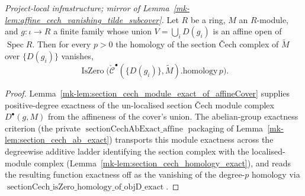 \begin{lemma}\label{mk-lem:sectionCech_homology_exact_of_affineCover}
  \leanok

  \textit{Project-local infrastructure; mirror of
  Lemma~\ref{mk-lem:affine_cech_vanishing_tilde_subcover}.}
  Let \(R\) be a ring, \(M\) an \(R\)-module, and \(g : \iota \to R\) a finite family whose union
  \(V = \bigcup_i D(g_i)\) is an affine open of \(\operatorname{Spec} R\). Then for every \(p > 0\) the
  homology of the section {\v C}ech complex of \(\widetilde{M}\) over \(\{D(g_i)\}\) vanishes,
  \[
    \operatorname{IsZero}\bigl(\check{\mathcal{C}}^\bullet(\{D(g_i)\}, \widetilde{M}).\mathrm{homology}\, p\bigr).
  \]
\end{lemma}
\begin{proof}
  \leanok
  Lemma~\ref{mk-lem:section_cech_module_exact_of_affineCover} supplies positive-degree exactness of the
  un-localised section {\v C}ech module complex \(D^\bullet(g, M)\) from the affineness of the cover's
  union. The abelian-group exactness criterion (the private \(\operatorname{sectionCechAbExact\_affine}\)
  packaging of Lemma~\ref{mk-lem:section_cech_ab_exact}) transports this module exactness across the
  degreewise additive ladder identifying the section complex with the localised-module complex
  (Lemma~\ref{mk-lem:section_cech_homology_exact}), and reads the resulting function exactness off as the
  vanishing of the degree-\(p\) homology via
  \(\operatorname{sectionCech\_isZero\_homology\_of\_objD\_exact}\).
\end{proof}

